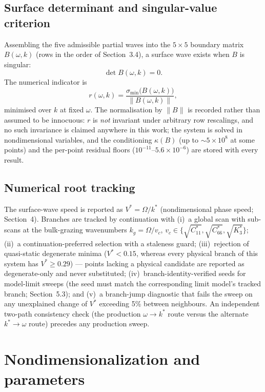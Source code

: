 \documentclass[11pt]{article}
\newcommand{\om}{\omega}
\newcommand{\Om}{\Omega}
\begin{document}
\subsection{Surface determinant and singular-value criterion}

Assembling the five admissible partial waves into the $5\times5$ boundary matrix $B(\om,k)$ (rows in the order of Section~3.4), a surface wave exists when $B$ is singular:
\begin{equation}
\det B(\om,k)=0. \label{eq:secular}
\end{equation}
The numerical indicator is
\begin{equation}
r(\om,k)=\frac{\sigma_{\min}\big(B(\om,k)\big)}{\lVert B(\om,k)\rVert}, \label{eq:rind}
\end{equation}
minimised over $k$ at fixed $\om$. The normalisation by $\lVert B\rVert$ is recorded rather than assumed to be innocuous: $r$ is \emph{not} invariant under arbitrary row rescalings, and no such invariance is claimed anywhere in this work; the system is solved in nondimensional variables, and the conditioning $\kappa(B)$ (up to $\sim5\times10^8$ at some points) and the per-point residual floors ($10^{-11}$--$5.6\times10^{-6}$) are stored with every result.

\subsection{Numerical root tracking}

The surface-wave speed is reported as $V^*=\Om/k^*$ (nondimensional phase speed; Section~4). Branches are tracked by continuation with (i)~a global scan with sub-scans at the bulk-grazing wavenumbers $k_g=\Om/v_c$, $v_c\in\{\sqrt{C_{11}^*},\sqrt{C_{66}^*},\sqrt{K_3^*}\}$; (ii)~a continuation-preferred selection with a staleness guard; (iii)~rejection of quasi-static degenerate minima ($V^*<0.15$, whereas every physical branch of this system has $V^*\ge0.29$) --- points lacking a physical candidate are reported as degenerate-only and never substituted; (iv)~branch-identity-verified seeds for model-limit sweeps (the seed must match the corresponding limit model's tracked branch; Section~5.3); and (v)~a branch-jump diagnostic that fails the sweep on any unexplained change of $V^*$ exceeding 5\% between neighbours. An independent two-path consistency check (the production $\om\to k^*$ route versus the alternate $k^*\to\om$ route) precedes any production sweep.

\section{Nondimensionalization and parameters}
\end{document}

